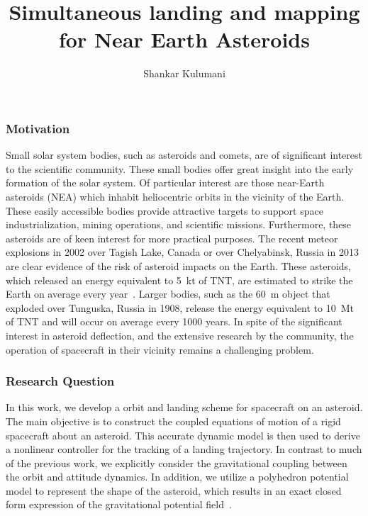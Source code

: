 \documentclass[11pt,reqno,twocolumn]{article} %
\title{Simultaneous landing and mapping for Near Earth Asteroids}
\author{Shankar Kulumani}
\date{} %
\begin{document}
\maketitle
\subsubsection*{Motivation}
Small solar system bodies, such as asteroids and comets, are of significant interest to the scientific community.
These small bodies offer great insight into the early formation of the solar system.
Of particular interest are those near-Earth asteroids (NEA) which inhabit heliocentric orbits in the vicinity of the Earth.
These easily accessible bodies provide attractive targets to support space industrialization, mining operations, and scientific missions.
Furthermore, these asteroids are of keen interest for more practical purposes.
The recent meteor explosions in  2002 over Tagish Lake, Canada or over Chelyabinsk, Russia in 2013 are clear evidence of the risk of asteroid impacts on the Earth.
These asteroids, which released an energy equivalent to \SI{5}{\kilo\tonne} of TNT, are estimated to strike the Earth on average every year~\cite{brown2002}.
Larger bodies, such as the \SI{60}{\meter} object that exploded over Tunguska, Russia in 1908, release the energy equivalent to \SI{10}{\mega\tonne} of TNT and will occur on average every \num{1000} years.
In spite of the significant interest in asteroid deflection, and the extensive research by the community, the operation of spacecraft in their vicinity remains a challenging problem.

\subsubsection*{Research Question}
In this work, we develop a orbit and landing scheme for spacecraft on an asteroid.
The main objective is to construct the coupled equations of motion of a rigid spacecraft about an asteroid.
This accurate dynamic model is then used to derive a nonlinear controller for the tracking of a landing trajectory.
In contrast to much of the previous work, we explicitly consider the gravitational coupling between the orbit and attitude dynamics.
In addition, we utilize a polyhedron potential model to represent the shape of the asteroid, which results in an exact closed form expression of the gravitational potential field~\cite{werner1994,werner1996}.
\end{document}
